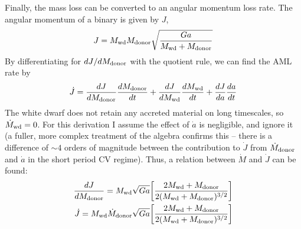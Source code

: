 Finally, the mass loss can be converted to an angular momentum loss rate. The angular momentum of a binary is given by $J$,
\begin{equation}
    J = M_{\rm wd} M_{\rm donor} \sqrt{\frac{Ga}{M_{\rm wd} + M_{\rm donor}}}
\end{equation}
By differentiating for ${dJ}/{dM_{\rm donor}}$ with the quotient rule, we can find the AML rate by
\begin{equation}
    \dot J = \frac{dJ}{dM_{\rm donor}} \frac{dM_{\rm donor}}{dt} + \frac{dJ}{dM_{\rm wd}} \frac{dM_{\rm wd}}{dt} + \frac{dJ}{da} \frac{da}{dt}
\end{equation}
The white dwarf does not retain any accreted material on long timescales, so $\dot M_{\rm wd} = 0$. For this derivation I assume the effect of $\dot a$ is negligible, and ignore it (a fuller, more complex treatment of the algebra confirms this -- there is a difference of $\sim 4$ orders of magnitude between the contribution to $\dot J$ from $\dot M_{\rm donor}$ and $\dot a$ in the short period CV regime). Thus, a relation between $\dot M$ and $\dot J$ can be found:
\begin{align}
    \frac{dJ}{dM_{\rm donor}} = M_{\rm wd} \sqrt{Ga} \bigg[ \frac{2M_{\rm wd} + M_{\rm donor}}{2 (M_{\rm wd} + M_{\rm donor})^{3/2}} \bigg] \\
    \dot J = M_{\rm wd} \dot M_{\rm donor} \sqrt{Ga} \bigg[ \frac{2M_{\rm wd} + M_{\rm donor}}{2 (M_{\rm wd} + M_{\rm donor})^{3/2}} \bigg] \label{eqn:modelling:Jdot from Mdot}
\end{align}



